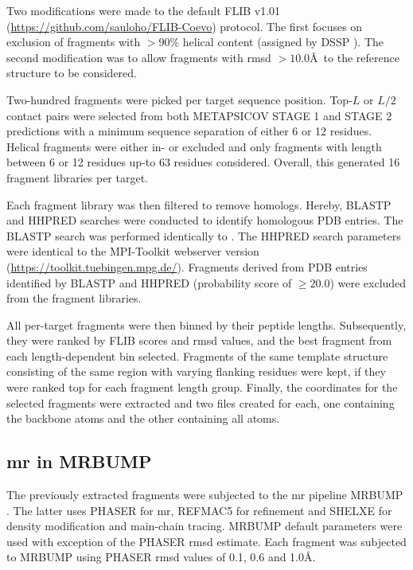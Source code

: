 Two modifications were made to the default FLIB v1.01 (\url{https://github.com/sauloho/FLIB-Coevo}) protocol. The first focuses on exclusion of fragments with $>90$\% helical content (assigned by DSSP \cite{Frishman1995-ns}). The second modification was to allow fragments with \gls{rmsd} $>10.0$\AA\ to the reference structure to be considered.

Two-hundred fragments were picked per target sequence position. Top-$L$ or $L/2$ contact pairs were selected from both METAPSICOV STAGE 1 and STAGE 2 predictions with a minimum sequence separation of either 6 or 12 residues. Helical fragments were either in- or excluded and only fragments with length between 6 or 12 residues up-to 63 residues considered. Overall, this generated 16 fragment libraries per target.

Each fragment library was then filtered to remove homologs. Hereby, BLASTP and HHPRED \cite{Soding2005-sx} searches were conducted to identify homologous PDB entries. The BLASTP search was performed identically to \cite{De_Oliveira2015-ba}. The HHPRED search parameters were identical to the MPI-Toolkit \cite{Biegert2006-ny} webserver version (\url{https://toolkit.tuebingen.mpg.de/}). Fragments derived from PDB entries identified by BLASTP and HHPRED (probability score of $\geq20.0$) were excluded from the fragment libraries.

All per-target fragments were then binned by their peptide lengths. Subsequently, they were ranked by FLIB scores and \gls{rmsd} values, and the best fragment from each length-dependent bin selected. Fragments of the same template structure consisting of the same region with varying flanking residues were kept, if they were ranked top for each fragment length group. Finally, the coordinates for the selected fragments were extracted and two files created for each, one containing the backbone atoms and the other containing all atoms.

\subsection{\acrlong{mr} in MRBUMP}
The previously extracted fragments were subjected to the \gls{mr} pipeline MRBUMP \cite{Keegan2008-hk}. The latter uses PHASER \cite{McCoy2007-bf} for \gls{mr}, REFMAC5 \cite{Murshudov2011-we} for refinement and SHELXE \cite{Thorn2013-ir} for density modification and main-chain tracing. MRBUMP default parameters were used with exception of the PHASER \gls{rmsd} estimate. Each fragment was subjected to MRBUMP using PHASER \gls{rmsd} values of 0.1, 0.6 and 1.0\AA.

